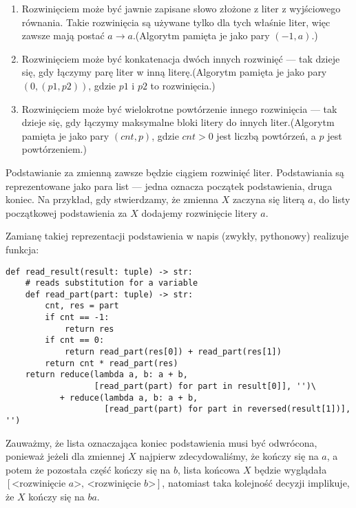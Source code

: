 \documentclass[leqno, 12pt]{article}
\begin{document}
\begin{enumerate}
	\item Rozwinięciem może być jawnie zapisane słowo złożone z liter z wyjściowego równania. Takie rozwinięcia są używane tylko dla tych właśnie liter, więc zawsze mają postać $a \rightarrow a$.\newline (Algorytm pamięta je jako pary $(-1, a)$.)

	\item Rozwinięciem może być konkatenacja dwóch innych rozwinięć --- tak dzieje się, gdy łączymy parę liter w inną literę.\newline (Algorytm pamięta je jako pary $(0, (p1, p2))$, gdzie $p1$ i $p2$ to rozwinięcia.)

	\item Rozwinięciem może być wielokrotne powtórzenie innego rozwinięcia --- tak dzieje się, gdy łączymy maksymalne bloki litery do innych liter.\newline (Algorytm pamięta je jako pary $(cnt, p)$, gdzie $cnt > 0$ jest liczbą powtórzeń, a $p$ jest powtórzeniem.)

\end{enumerate}


Podstawianie za zmienną zawsze będzie ciągiem rozwinięć liter. Podstawiania są reprezentowane jako para list --- jedna oznacza początek podstawienia, druga koniec. Na przykład, gdy stwierdzamy, że zmienna $X$ zaczyna się literą $a$, do listy początkowej podstawienia za $X$ dodajemy rozwinięcie litery $a$.

\newpage
Zamianę takiej reprezentacji podstawienia w napis (zwykły, pythonowy) realizuje funkcja:
\begin{verbatim}
def read_result(result: tuple) -> str:
    # reads substitution for a variable
    def read_part(part: tuple) -> str:
        cnt, res = part
        if cnt == -1:
            return res
        if cnt == 0:
            return read_part(res[0]) + read_part(res[1])
        return cnt * read_part(res)
    return reduce(lambda a, b: a + b,
                  [read_part(part) for part in result[0]], '')\
           + reduce(lambda a, b: a + b,
                    [read_part(part) for part in reversed(result[1])], '')
\end{verbatim}
Zauważmy, że lista oznaczająca koniec podstawienia musi być odwrócona, ponieważ jeżeli dla zmiennej $X$ najpierw zdecydowaliśmy, że kończy się na $a$, a potem że pozostała część kończy się na $b$, lista końcowa $X$ będzie wyglądała \newline$[\text{<rozwinięcie }a\text{>, <rozwinięcie }b\text{>}]$, natomiast taka kolejność decyzji implikuje, że $X$ kończy się na $ba$.
\end{document}

